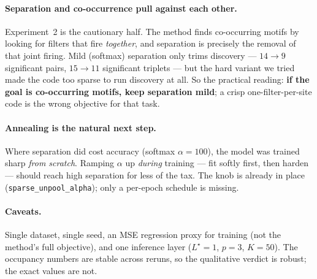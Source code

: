 \paragraph{Separation and co-occurrence pull against each other.} Experiment~2 is the cautionary
half. The method finds co-occurring motifs by looking for filters that fire \emph{together}, and
separation is precisely the removal of that joint firing. Mild (softmax) separation only trims
discovery --- $14\to9$ significant pairs, $15\to11$ significant triplets --- but the hard variant we
tried made the code too sparse to run discovery at all. So the practical reading: \textbf{if the
goal is co-occurring motifs, keep separation mild}; a crisp one-filter-per-site code is the wrong
objective for that task.

\paragraph{Annealing is the natural next step.} Where separation did cost accuracy (softmax
$\alpha=100$), the model was trained sharp \emph{from scratch}. Ramping $\alpha$ up \emph{during}
training --- fit softly first, then harden --- should reach high separation for less of the tax.
The knob is already in place (\texttt{sparse\_unpool\_alpha}); only a per-epoch schedule is missing.

\paragraph{Caveats.} Single dataset, single seed, an MSE regression proxy for training (not the
method's full objective), and one inference layer ($L^\star=1$, $p=3$, $K=50$). The occupancy
numbers are stable across reruns, so the qualitative verdict is robust; the exact values are not.
